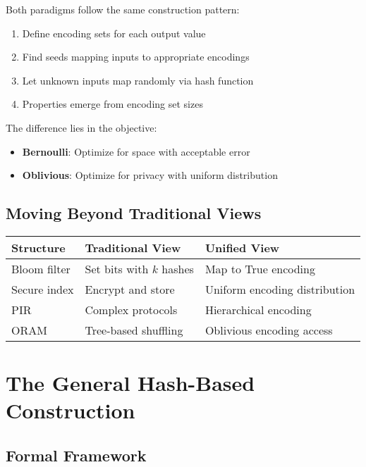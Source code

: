 \documentclass[11pt,final,hidelinks]{article}
\begin{document}
Both paradigms follow the same construction pattern:
\begin{enumerate}
    \item Define encoding sets for each output value
    \item Find seeds mapping inputs to appropriate encodings
    \item Let unknown inputs map randomly via hash function
    \item Properties emerge from encoding set sizes
\end{enumerate}

The difference lies in the objective:
\begin{itemize}
    \item \textbf{Bernoulli}: Optimize for space with acceptable error
    \item \textbf{Oblivious}: Optimize for privacy with uniform distribution
\end{itemize}

\subsection{Moving Beyond Traditional Views}

\begin{center}
\begin{tabular}{lll}
\textbf{Structure} & \textbf{Traditional View} & \textbf{Unified View} \\
\hline
Bloom filter & Set bits with $k$ hashes & Map to True encoding \\
Secure index & Encrypt and store & Uniform encoding distribution \\
PIR & Complex protocols & Hierarchical encoding \\
ORAM & Tree-based shuffling & Oblivious encoding access \\
\end{tabular}
\end{center}

\section{The General Hash-Based Construction}

\subsection{Formal Framework}
\end{document}
